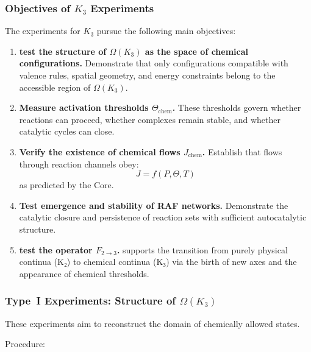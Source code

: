 \subsubsection{Objectives of \texorpdfstring{$K_3$}{K_3} Experiments}

The experiments for $K_3$ pursue the following main objectives:

\begin{enumerate}
    \item \textbf{test the structure of $\Omega(K_3)$ as the space of
          chemical configurations.}
          Demonstrate that only configurations compatible with valence rules,
          spatial geometry, and energy constraints belong to the accessible
          region of $\Omega(K_3)$.

    \item \textbf{Measure activation thresholds $\Theta_{\mathrm{chem}}$.}
          These thresholds govern whether reactions can proceed, whether
          complexes remain stable, and whether catalytic cycles can close.

    \item \textbf{Verify the existence of chemical flows $J_{\mathrm{chem}}$.}
          Establish that flows through reaction channels obey:
          \[
              J = f(P, \Theta, T)
          \]
          as predicted by the Core.

    \item \textbf{Test emergence and stability of RAF networks.}
          Demonstrate the catalytic closure and persistence of reaction sets
          with sufficient autocatalytic structure.

    \item \textbf{test the operator $F_{2 \rightarrow 3}$.}
          supports the transition from purely physical continua (K₂) to chemical
          continua (K₃) via the birth of new axes and the appearance of
          chemical thresholds.
\end{enumerate}



\subsubsection{Type~I Experiments: Structure of \texorpdfstring{$\Omega(K_3)$}{\Omega(K_3)}}

These experiments aim to reconstruct the domain of chemically allowed states.

Procedure:

